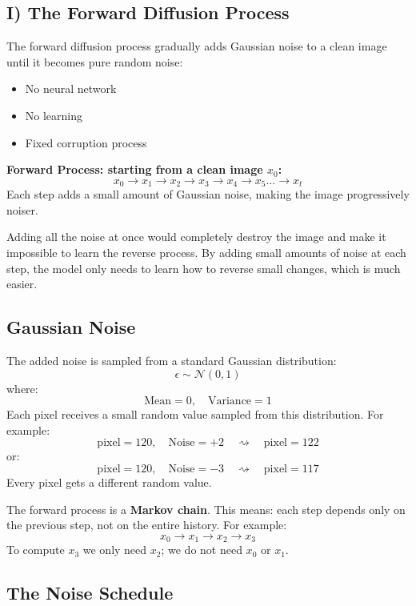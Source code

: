 \subsection*{I) The Forward Diffusion Process}

The forward diffusion process gradually adds Gaussian noise to a clean image until it becomes pure random noise:
\begin{itemize}
    \item No neural network
    \item No learning
    \item Fixed corruption process
\end{itemize}

\textbf{Forward Process: starting from a clean image $x_0$:}
\[
x_0 \longrightarrow x_1 \longrightarrow x_2 \longrightarrow x_3 \longrightarrow x_4 \longrightarrow x_5 \dots \longrightarrow x_t
\]
Each step adds a small amount of Gaussian noise, making the image progressively noiser.

Adding all the noise at once would completely destroy the image and make it impossible to learn the reverse process.
By adding small amounts of noise at each step, the model only needs to learn how to reverse small changes, which is much easier.

\subsection*{Gaussian Noise}

The added noise is sampled from a standard Gaussian distribution:
\[
\epsilon \sim \mathcal{N}(0, 1)
\]
where:
\[
\text{Mean} = 0, \quad \text{Variance} = 1
\]
Each pixel receives a small random value sampled from this distribution. For example:
\[
\text{pixel} = 120, \quad \text{Noise} = +2 \quad \rightsquigarrow \quad \text{pixel} = 122
\]
or:
\[
\text{pixel} = 120, \quad \text{Noise} = -3 \quad \rightsquigarrow \quad \text{pixel} = 117
\]
Every pixel gets a different random value.

The forward process is a \textbf{Markov chain}. This means: each step depends only on the previous step, not on the entire history. For example:
\[
x_0 \longrightarrow x_1 \longrightarrow x_2 \longrightarrow x_3
\]
To compute $x_3$ we only need $x_2$; we do not need $x_0$ or $x_1$.

\subsection*{The Noise Schedule}

